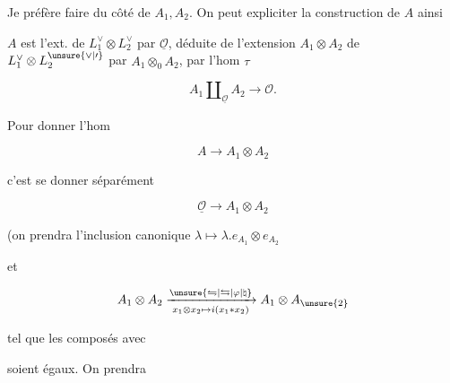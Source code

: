 
Je préfère faire  du côté de $A_1,A_2$. On peut expliciter la construction de $A$ ainsi



$A$  est l'ext. de $L_1^\vee\otimes L_2^\vee$ par $\underline{\mathcal O}$, déduite de l'extension $A_1\otimes A_2$ de $L_1^\vee\otimes L_{2}^{\unsure{\vee|\prime}}$ par $A_1\otimes_0 A_2$, par l'hom $\tau$

\[
A_1\amalg_{\underline{\mathcal O}}A_2\longrightarrow\mathcal O.
\]

Pour donner l'hom

\[
A\longrightarrow A_1\otimes A_2
\]

c'est se donner séparément

\[
\underline{\mathcal O}\longrightarrow A_1\otimes A_2
\]

(on prendra l'inclusion canonique $\lambda\longmapsto\lambda.e_{A_1}\otimes e_{A_2}$

et

\[
A_1\otimes A_2\xrightarrow[x_1\otimes x_2\mapsto i(x_1*x_2)]{\unsure{\leftrightharpoons|\leftrightarrows|\varphi|\natural}}A_1\otimes A_{\unsure{2}}
\]

tel que les composés avec


soient égaux. On prendra


